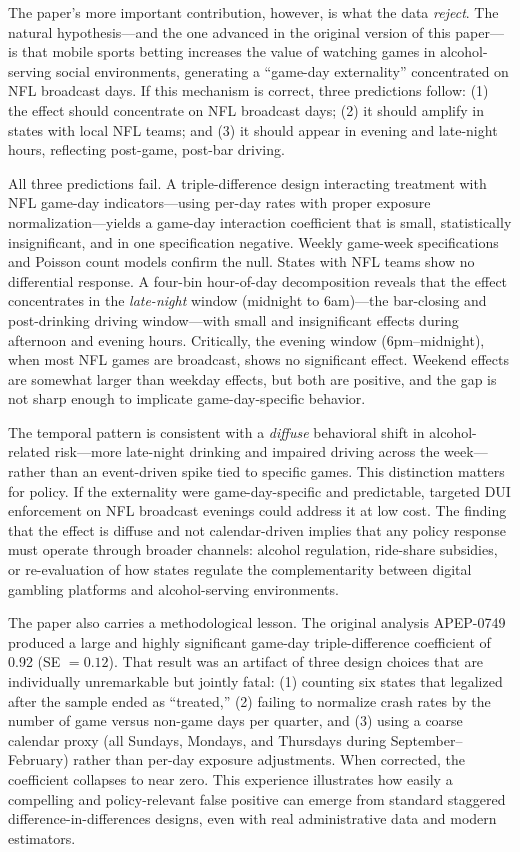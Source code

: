 \documentclass[12pt]{article}
\begin{document}
The paper's more important contribution, however, is what the data \textit{reject}. The natural hypothesis---and the one advanced in the original version of this paper---is that mobile sports betting increases the value of watching games in alcohol-serving social environments, generating a ``game-day externality'' concentrated on NFL broadcast days. If this mechanism is correct, three predictions follow: (1) the effect should concentrate on NFL broadcast days; (2) it should amplify in states with local NFL teams; and (3) it should appear in evening and late-night hours, reflecting post-game, post-bar driving.

All three predictions fail. A triple-difference design interacting treatment with NFL game-day indicators---using per-day rates with proper exposure normalization---yields a game-day interaction coefficient that is small, statistically insignificant, and in one specification negative. Weekly game-week specifications and Poisson count models confirm the null. States with NFL teams show no differential response. A four-bin hour-of-day decomposition reveals that the effect concentrates in the \textit{late-night} window (midnight to 6am)---the bar-closing and post-drinking driving window---with small and insignificant effects during afternoon and evening hours. Critically, the evening window (6pm--midnight), when most NFL games are broadcast, shows no significant effect. Weekend effects are somewhat larger than weekday effects, but both are positive, and the gap is not sharp enough to implicate game-day-specific behavior.

The temporal pattern is consistent with a \textit{diffuse} behavioral shift in alcohol-related risk---more late-night drinking and impaired driving across the week---rather than an event-driven spike tied to specific games. This distinction matters for policy. If the externality were game-day-specific and predictable, targeted DUI enforcement on NFL broadcast evenings could address it at low cost. The finding that the effect is diffuse and not calendar-driven implies that any policy response must operate through broader channels: alcohol regulation, ride-share subsidies, or re-evaluation of how states regulate the complementarity between digital gambling platforms and alcohol-serving environments.

The paper also carries a methodological lesson. The original analysis {APEP-0749} produced a large and highly significant game-day triple-difference coefficient of 0.92 (SE $= 0.12$). That result was an artifact of three design choices that are individually unremarkable but jointly fatal: (1) counting six states that legalized after the sample ended as ``treated,'' (2) failing to normalize crash rates by the number of game versus non-game days per quarter, and (3) using a coarse calendar proxy (all Sundays, Mondays, and Thursdays during September--February) rather than per-day exposure adjustments. When corrected, the coefficient collapses to near zero. This experience illustrates how easily a compelling and policy-relevant false positive can emerge from standard staggered difference-in-differences designs, even with real administrative data and modern estimators.
\end{document}
